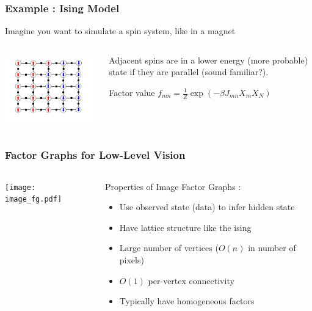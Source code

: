 \documentclass[compress]{beamer}
\begin{document}
\begin{frame}
  \frametitle{Example : Ising Model}
  Imagine you want to simulate a spin system, like in a magnet
  \begin{columns}
    \begin{column}{7cm}
      \includegraphics[width=7cm]{ising_fg}
    \end{column}
    \begin{column}{4cm}
      Adjacent spins are in a lower energy (more probable) state if
      they are parallel (sound familiar?).

      \begin{block}{Factor value}
        $f_{mn} = \frac{1}{Z}\exp(-\beta J_{mn}X_mX_N)$
      \end{block}
    \end{column}
  \end{columns}
\end{frame}


\begin{frame} 
  \frametitle{Factor Graphs for Low-Level Vision}
  \begin{columns}
    \begin{column}{5cm}
      \texttt{[image: image\_fg.pdf]}
    \end{column}
    \begin{column}{5cm}
      Properties of Image Factor Graphs \cite{Freeman_Markov_1999}: 
      \begin{itemize}
      \item Use observed state (data) to infer hidden state
      \item Have lattice structure like the ising
      \item Large number of vertices ($O(n)$ in number of pixels)
      \item $O(1)$ per-vertex connectivity
      \item Typically have homogeneous factors
      \end{itemize}
    \end{column}
  \end{columns}
\end{frame}
\end{document}

